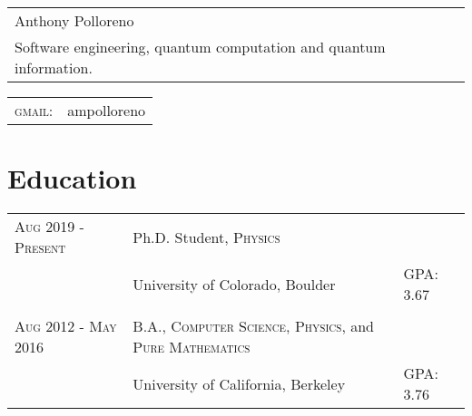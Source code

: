 \documentclass[a4paper,10pt]{article}
\begin{document}
\newcommand*{\fontin}[2]{{\setmainfont{Fontin}#1{#2}}}

\pagestyle{empty} %




\begin{tabular}{p{2.6in}}
{\Huge Anthony Polloreno}\\
Software engineering, quantum computation and quantum information.\\
\end{tabular}
\hfill
\begin{tabular}{lr}
    \fontin{\textsc}{gmail:}     & ampolloreno\\
    \end{tabular}

\section{Education}
\begin{tabular}{l|ll}
  \fontin{\textsc}{Aug 2019 - Present} & Ph.D. Student, \fontin{\textsc}{Physics} \\ & University of Colorado, Boulder & GPA: 3.67 \\ \\
  \fontin{\textsc}{Aug 2012 - May 2016} & B.A., \fontin{\textsc}{Computer Science}, \fontin{\textsc}{Physics}, and \fontin{\textsc}{Pure Mathematics} \\ &University of California, Berkeley & GPA: 3.76 \\
\end{tabular}
\end{document}
